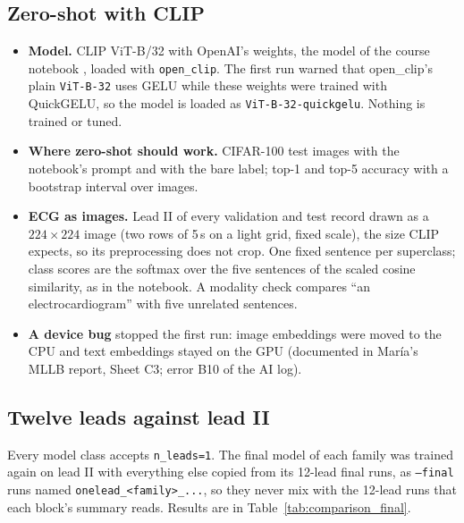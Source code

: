 \subsection{Zero-shot with CLIP}

\begin{itemize}[leftmargin=1.2em,itemsep=1pt]
  \item \textbf{Model.} CLIP ViT-B/32 with OpenAI's weights, the model of the course notebook
        \cite{course_nb_clip}, loaded with \texttt{open\_clip}. The first run warned that open\_clip's plain
        \texttt{ViT-B-32} uses GELU while these weights were trained with QuickGELU, so the model is loaded
        as \texttt{ViT-B-32-quickgelu}. Nothing is trained or tuned.
  \item \textbf{Where zero-shot should work.} CIFAR-100 test images with the notebook's prompt and with the
        bare label; top-1 and top-5 accuracy with a bootstrap interval over images.
  \item \textbf{ECG as images.} Lead II of every validation and test record drawn as a $224\times224$
        image (two rows of 5\,s on a light grid, fixed scale), the size CLIP expects, so its preprocessing
        does not crop. One fixed sentence per superclass; class scores are the softmax over the five
        sentences of the scaled cosine similarity, as in the notebook. A modality check compares
        ``an electrocardiogram'' with five unrelated sentences.
  \item \textbf{A device bug} stopped the first run: image embeddings were moved to the CPU and text
        embeddings stayed on the GPU (documented in Mar\'ia's MLLB report, Sheet C3; error B10 of the AI log).
\end{itemize}



\subsection{Twelve leads against lead II}

Every model class accepts \texttt{n\_leads=1}. The final model of each family was trained again on lead
II with everything else copied from its 12-lead final runs, as \texttt{--final} runs named
\texttt{onelead\_<family>\_...}, so they never mix with the 12-lead runs that each block's summary reads.
Results are in Table~\ref{tab:comparison_final}.
